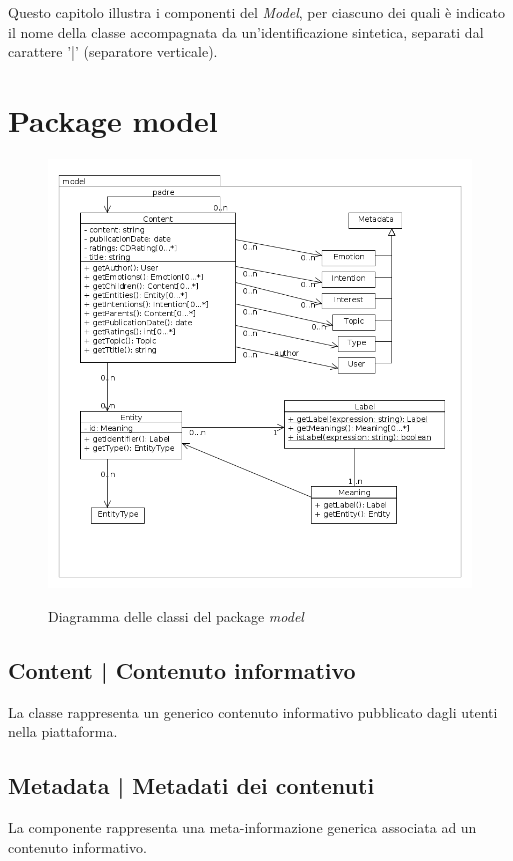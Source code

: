 \documentclass[10pt,a4paper,headinclude,footinclude,hidelinks]{scrreprt} %
\begin{document}
	Questo capitolo illustra i componenti del \textit{Model}, per ciascuno dei quali è indicato il nome della classe accompagnata da un'identificazione sintetica, separati dal carattere '|' (separatore verticale).

	\section{Package model}
	\label{sec:stage:design:model}

	\begin{figure}[ht]
		\begin{center}
	    	\includegraphics[width=12cm]{class/model.png}
			\label{gfx:package:model:model}
			\caption{Diagramma delle classi del package \textit{model}}
		\end{center}
	\end{figure}

	\subsection[Content]{Content | Contenuto informativo}
	\label{sec:stage:design:model:content}
	La classe \textit{} rappresenta un generico contenuto informativo pubblicato dagli utenti nella piattaforma.

	\subsection[Metadata]{Metadata | Metadati dei contenuti}
	\label{sec:stage:design:model:metadata}
	La componente \textit{} rappresenta una meta-informazione generica associata ad un contenuto informativo.
\end{document}
